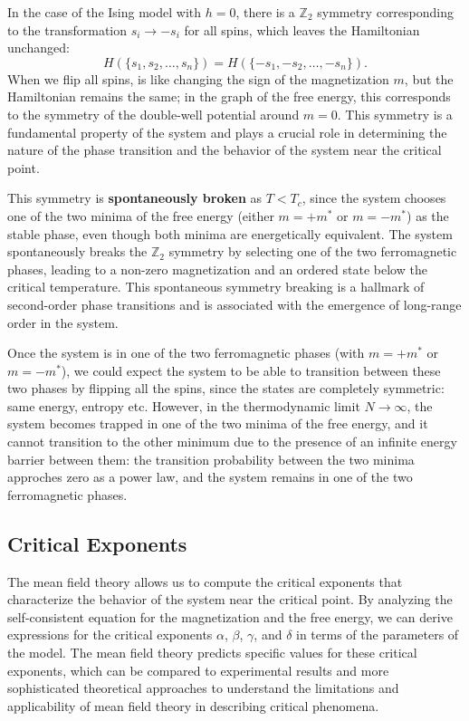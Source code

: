 In the case of the Ising model with \(h=0\), there is a \(\mathbb{Z}_2\) symmetry corresponding to the transformation \(s_i \to -s_i\) for all spins, which leaves the Hamiltonian unchanged:
\[
    H(\{s_1, s_2, \ldots, s_n\}) = H(\{-s_1, -s_2, \ldots, -s_n\}).
\]
When we flip all spins, is like changing the sign of the magnetization \(m\), but the Hamiltonian remains the same; in the graph of the free energy, this corresponds to the symmetry of the double-well potential around \(m=0\). This symmetry is a fundamental property of the system and plays a crucial role in determining the nature of the phase transition and the behavior of the system near the critical point.

This symmetry is \textbf{spontaneously broken} as \(T < T_c\), since the system chooses one of the two minima of the free energy (either \(m = +m^*\) or \(m = -m^*\)) as the stable phase, even though both minima are energetically equivalent. The system spontaneously breaks the \(\mathbb{Z}_2\) symmetry by selecting one of the two ferromagnetic phases, leading to a non-zero magnetization and an ordered state below the critical temperature. This spontaneous symmetry breaking is a hallmark of second-order phase transitions and is associated with the emergence of long-range order in the system.

Once the system is in one of the two ferromagnetic phases (with \(m = +m^*\) or \(m = -m^*\)), we could expect the system to be able to transition between these two phases by flipping all the spins, since the states are completely symmetric: same energy, entropy etc. However, in the thermodynamic limit \(N \to \infty\), the system becomes trapped in one of the two minima of the free energy, and it cannot transition to the other minimum due to the presence of an infinite energy barrier between them: the transition probability between the two minima approches zero as a power law, and the system remains in one of the two ferromagnetic phases.

\subsection{Critical Exponents}

The mean field theory allows us to compute the critical exponents that characterize the behavior of the system near the critical point. By analyzing the self-consistent equation for the magnetization and the free energy, we can derive expressions for the critical exponents \(\alpha\), \(\beta\), \(\gamma\), and \(\delta\) in terms of the parameters of the model. The mean field theory predicts specific values for these critical exponents, which can be compared to experimental results and more sophisticated theoretical approaches to understand the limitations and applicability of mean field theory in describing critical phenomena.

